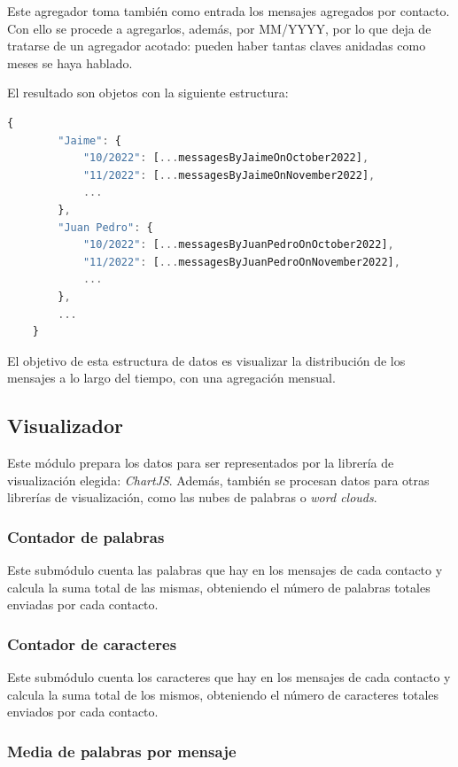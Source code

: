 Este agregador toma también como entrada los mensajes agregados por contacto. Con ello se procede a agregarlos, además, por MM/YYYY, por lo que deja de tratarse de un agregador acotado: pueden haber tantas claves anidadas como meses se haya hablado.

El resultado son objetos con la siguiente estructura:

\begin{lstlisting}[language=JavaScript]
	{
		"Jaime": {
			"10/2022": [...messagesByJaimeOnOctober2022],
			"11/2022": [...messagesByJaimeOnNovember2022],
			...
		},
		"Juan Pedro": {
			"10/2022": [...messagesByJuanPedroOnOctober2022],
			"11/2022": [...messagesByJuanPedroOnNovember2022],
			...
		},
		...
	}
\end{lstlisting}

El objetivo de esta estructura de datos es visualizar la distribución de los mensajes a lo largo del tiempo, con una agregación mensual.

\subsection{Visualizador}


Este módulo prepara los datos para ser representados por la librería de visualización elegida: \textit{ChartJS}. Además, también se procesan datos para otras librerías de visualización, como las nubes de palabras o \textit{word clouds}.

\subsubsection{Contador de palabras}

Este submódulo cuenta las palabras que hay en los mensajes de cada contacto y calcula la suma total de las mismas, obteniendo el número de palabras totales enviadas por cada contacto.

\subsubsection{Contador de caracteres}

Este submódulo cuenta los caracteres que hay en los mensajes de cada contacto y calcula la suma total de los mismos, obteniendo el número de caracteres totales enviados por cada contacto.

\subsubsection{Media de palabras por mensaje}

